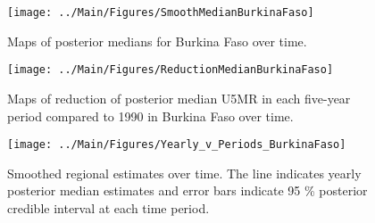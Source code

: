 \documentclass[12pt]{article}\usepackage[]{graphicx}\usepackage[]{color}
\newenvironment{knitrout}{}{} %
\begin{document}
\begin{knitrout}
\color{fgcolor}\begin{figure}[bht]

{\centering \texttt{[image: ../Main/Figures/SmoothMedianBurkinaFaso]} 

}

\caption[Maps of posterior medians for Burkina Faso  over time]{Maps of posterior medians for Burkina Faso  over time.}\label{fig:unnamed-chunk-24}
\end{figure}


\end{knitrout}
\begin{knitrout}
\color{fgcolor}\begin{figure}[bht]

{\centering \texttt{[image: ../Main/Figures/ReductionMedianBurkinaFaso]} 

}

\caption[Maps of reduction of posterior median U5MR in each five-year period compared to 1990 in Burkina Faso over time]{Maps of reduction of posterior median U5MR in each five-year period compared to 1990 in Burkina Faso over time.}\label{fig:unnamed-chunk-25}
\end{figure}


\end{knitrout}
\begin{knitrout}
\color{fgcolor}\begin{figure}[bht]

{\centering \texttt{[image: ../Main/Figures/Yearly\_v\_Periods\_BurkinaFaso]} 

}

\caption[Smoothed regional estimates over time]{Smoothed regional estimates over time. The line indicates yearly posterior median estimates and error bars indicate 95 \% posterior credible interval at each time period.}\label{fig:unnamed-chunk-26}
\end{figure}


\end{knitrout}
\end{document}
